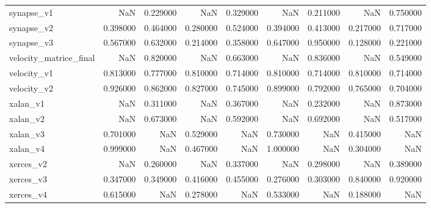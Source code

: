\begin{table}
\begin{tabular}{lrrrrrrrr}
synapse_v1 & NaN & 0.229000 & NaN & 0.329000 & NaN & 0.211000 & NaN & 0.750000 \\
synapse_v2 & 0.398000 & 0.464000 & 0.280000 & 0.524000 & 0.394000 & 0.413000 & 0.217000 & 0.717000 \\
synapse_v3 & 0.567000 & 0.632000 & 0.214000 & 0.358000 & 0.647000 & 0.950000 & 0.128000 & 0.221000 \\
velocity_matrice_final & NaN & 0.820000 & NaN & 0.663000 & NaN & 0.836000 & NaN & 0.549000 \\
velocity_v1 & 0.813000 & 0.777000 & 0.810000 & 0.714000 & 0.810000 & 0.714000 & 0.810000 & 0.714000 \\
velocity_v2 & 0.926000 & 0.862000 & 0.827000 & 0.745000 & 0.899000 & 0.792000 & 0.765000 & 0.704000 \\
xalan_v1 & NaN & 0.311000 & NaN & 0.367000 & NaN & 0.232000 & NaN & 0.873000 \\
xalan_v2 & NaN & 0.673000 & NaN & 0.592000 & NaN & 0.692000 & NaN & 0.517000 \\
xalan_v3 & 0.701000 & NaN & 0.529000 & NaN & 0.730000 & NaN & 0.415000 & NaN \\
xalan_v4 & 0.999000 & NaN & 0.467000 & NaN & 1.000000 & NaN & 0.304000 & NaN \\
xerces_v2 & NaN & 0.260000 & NaN & 0.337000 & NaN & 0.298000 & NaN & 0.389000 \\
xerces_v3 & 0.347000 & 0.349000 & 0.416000 & 0.455000 & 0.276000 & 0.303000 & 0.840000 & 0.920000 \\
xerces_v4 & 0.615000 & NaN & 0.278000 & NaN & 0.533000 & NaN & 0.188000 & NaN \\
\bottomrule
\end{tabular}
\end{table}
